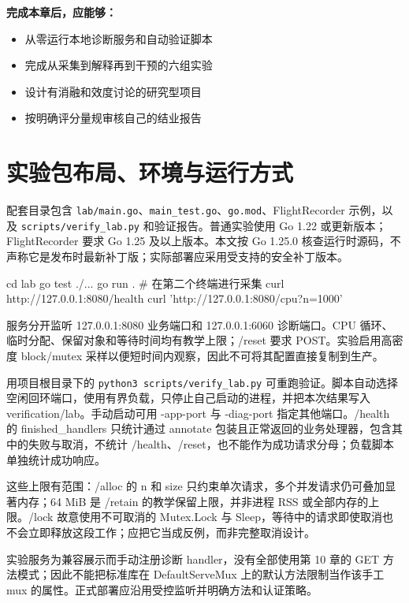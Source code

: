 \documentclass[UTF8,fontset=fandol,openany,11pt]{ctexbook}
\begin{document}
\noindent\textbf{完成本章后，应能够：}
\begin{itemize}
\item 从零运行本地诊断服务和自动验证脚本
\item 完成从采集到解释再到干预的六组实验
\item 设计有消融和效度讨论的研究型项目
\item 按明确评分量规审核自己的结业报告
\end{itemize}
\section{实验包布局、环境与运行方式}
配套目录包含 \texttt{lab/\allowbreak{}main.\allowbreak{}go}、\texttt{main\_\allowbreak{}test.\allowbreak{}go}、\texttt{go.\allowbreak{}mod}、FlightRecorder 示例，以及 \texttt{scripts/\allowbreak{}verify\_\allowbreak{}lab.\allowbreak{}py} 和验证报告。普通实验使用 Go 1.22 或更新版本；FlightRecorder 要求 Go 1.25 及以上版本。本文按 Go 1.25.0 核查运行时源码，不声称它是发布时最新补丁版；实际部署应采用受支持的安全补丁版本。

\begin{codeblock}
cd lab
go test ./...
go run .
# 在第二个终端进行采集
curl http://127.0.0.1:8080/health
curl 'http://127.0.0.1:8080/cpu?n=1000'
\end{codeblock}

服务分开监听 127.0.0.1:8080 业务端口和 127.0.0.1:6060 诊断端口。CPU 循环、临时分配、保留对象和等待时间均有教学上限；/reset 要求 POST。实验启用高密度 block/mutex 采样以便短时间内观察，因此不可将其配置直接复制到生产。

用项目根目录下的 \texttt{python3 scripts/\allowbreak{}verify\_\allowbreak{}lab.\allowbreak{}py} 可重跑验证。脚本自动选择空闲回环端口，使用有界负载，只停止自己启动的进程，并把本次结果写入 verification/lab。手动启动可用 -app-port 与 -diag-port 指定其他端口。/health 的 finished\_handlers 只统计通过 annotate 包装且正常返回的业务处理器，包含其中的失败与取消，不统计 /health、/reset，也不能作为成功请求分母；负载脚本单独统计成功响应。

这些上限有范围：/alloc 的 n 和 size 只约束单次请求，多个并发请求仍可叠加显著内存；64 MiB 是 /retain 的教学保留上限，并非进程 RSS 或全部内存的上限。/lock 故意使用不可取消的 Mutex.Lock 与 Sleep，等待中的请求即使取消也不会立即释放这段工作；应把它当成反例，而非完整取消设计。

实验服务为兼容展示而手动注册诊断 handler，没有全部使用第 10 章的 GET 方法模式；因此不能把标准库在 DefaultServeMux 上的默认方法限制当作该手工 mux 的属性。正式部署应沿用受控监听并明确方法和认证策略。
\end{document}
